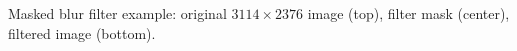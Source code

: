\label{fig:CS-convolution-images} Masked blur filter example: original $3114\times2376$ image (top), filter mask (center), filtered image (bottom).


